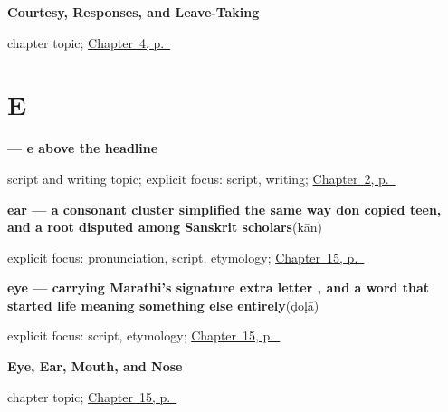 \noindent\begin{minipage}[t]{\linewidth}
\raggedright
\textbf{Courtesy, Responses, and Leave-Taking}\par
\footnotesize chapter topic; \hyperref[ch:greetings]{Chapter~4, p.~\pageref*{ch:greetings}}
\end{minipage}\par\smallskip

\section*{E}

\noindent\begin{minipage}[t]{\linewidth}
\raggedright
\textbf{ — e above the headline}\par
\footnotesize script and writing topic; explicit focus: script, writing; \hyperref[ch:thanks-script-a]{Chapter~2, p.~\pageref*{ch:thanks-script-a}}
\end{minipage}\par\smallskip

\noindent\begin{minipage}[t]{\linewidth}
\raggedright
\textbf{ear — a consonant cluster simplified the same way don copied teen, and a root disputed among Sanskrit scholars}\enspace\emph{}\enspace(kān)\par
\footnotesize explicit focus: pronunciation, script, etymology; \hyperref[ch:mr-face-parts]{Chapter~15, p.~\pageref*{ch:mr-face-parts}}
\end{minipage}\par\smallskip

\noindent\begin{minipage}[t]{\linewidth}
\raggedright
\textbf{eye — carrying Marathi's signature extra letter , and a word that started life meaning something else entirely}\enspace\emph{}\enspace(ḍoḷā)\par
\footnotesize explicit focus: script, etymology; \hyperref[ch:mr-face-parts]{Chapter~15, p.~\pageref*{ch:mr-face-parts}}
\end{minipage}\par\smallskip

\noindent\begin{minipage}[t]{\linewidth}
\raggedright
\textbf{Eye, Ear, Mouth, and Nose}\par
\footnotesize chapter topic; \hyperref[ch:mr-face-parts]{Chapter~15, p.~\pageref*{ch:mr-face-parts}}
\end{minipage}\par\smallskip

